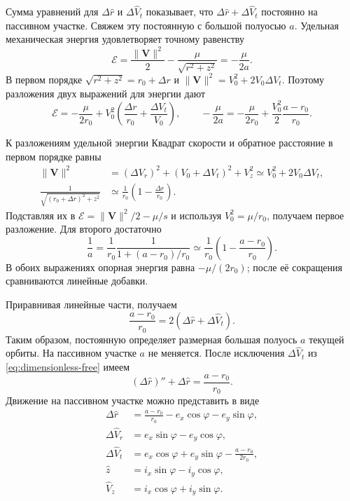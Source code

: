 \documentclass[a4paper,11pt]{article}
\numberwithin{equation}{section}
\theoremstyle{remark}
\begin{document}
Сумма уравнений для $\Delta\widehat r$ и $\Delta\widehat V_t$
показывает, что $\Delta\widehat r+\Delta\widehat V_t$ постоянно
на пассивном участке. Свяжем эту постоянную с большой полуосью $a$.
Удельная механическая энергия удовлетворяет точному равенству
\[
 \mathcal E=\frac{\lVert\boldsymbol V\rVert^2}{2}
             -\frac{\mu}{\sqrt{r^2+z^2}}=-\frac{\mu}{2a}.
\]
В первом порядке $\sqrt{r^2+z^2}=r_0+\Delta r$ и
$\lVert\boldsymbol V\rVert^2=V_0^2+2V_0\Delta V_t$.
Поэтому разложения двух выражений для энергии дают
\[
 \mathcal E=-\frac{\mu}{2r_0}
       +V_0^2\left(\frac{\Delta r}{r_0}+\frac{\Delta V_t}{V_0}\right),
 \qquad
 -\frac{\mu}{2a}=-\frac{\mu}{2r_0}
       +\frac{V_0^2}{2}\frac{a-r_0}{r_0}.
\]
\begin{explanation}{К разложениям удельной энергии}
Квадрат скорости и обратное расстояние в первом порядке равны
\[
\begin{aligned}
\lVert\boldsymbol V\rVert^2
 &=(\Delta V_r)^2+(V_0+\Delta V_t)^2+V_z^2
 \simeq V_0^2+2V_0\Delta V_t,\\
\frac1{\sqrt{(r_0+\Delta r)^2+z^2}}
 &\simeq\frac1{r_0}\left(1-\frac{\Delta r}{r_0}\right).
\end{aligned}
\]
Подставляя их в $\mathcal E=\lVert\boldsymbol V\rVert^2/2-\mu/s$
и используя $V_0^2=\mu/r_0$, получаем первое разложение.
Для второго достаточно
\[
\frac1a=\frac1{r_0}\frac1{1+(a-r_0)/r_0}
\simeq\frac1{r_0}\left(1-\frac{a-r_0}{r_0}\right).
\]
В обоих выражениях опорная энергия равна $-\mu/(2r_0)$;
после её сокращения сравниваются линейные добавки.
\end{explanation}
Приравнивая линейные части, получаем
\[
 \frac{a-r_0}{r_0}=2(\Delta\widehat r+\Delta\widehat V_t).
\]
Таким образом, постоянную определяет размерная большая полуось
$a$ текущей орбиты. На пассивном участке $a$ не меняется.
После исключения $\Delta\widehat V_t$ из
\eqref{eq:dimensionless-free} имеем
\[
 (\Delta\widehat r)''+\Delta\widehat r=\frac{a-r_0}{r_0}.
\]
Движение на пассивном участке можно представить в виде
\begin{equation}
 \begin{aligned}
  \Delta\widehat r&=\frac{a-r_0}{r_0}-e_x\cos\varphi-e_y\sin\varphi,\\
  \Delta\widehat V_r&=e_x\sin\varphi-e_y\cos\varphi,\\
  \Delta\widehat V_t&=e_x\cos\varphi+e_y\sin\varphi-\frac{a-r_0}{2r_0},\\
  \widehat z&=i_x\sin\varphi-i_y\cos\varphi,\\
  \widehat V_z&=i_x\cos\varphi+i_y\sin\varphi.
 \end{aligned}
 \label{eq:free-elements-solution}
\end{equation}
\end{document}
